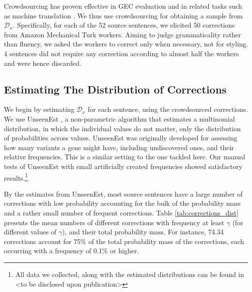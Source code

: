 \documentclass[letter,11pt]{article}
\begin{document}
Crowdsourcing has proven effective in GEC evaluation \cite{madnani2011they,napoles2015ground} and in
related tasks such as machine translation \cite{zaidan2011crowdsourcing,post2012constructing}. We thus
use crowdsourcing for obtaining a sample from $\mathcal{D}_x$. Specifically, for each of the 52 source
sentences, we elicited 50 corrections from Amazon Mechanical Turk workers.
Aiming to judge grammaticality rather than fluency, we asked the workers to
correct only when necessary, not for styling.
4 sentences did not require any correction according to almost half the workers and were hence discarded.
%
\subsection{Estimating The Distribution of Corrections}\label{subsec:corrections_distribution}
%
We begin by estimating $\mathcal{D}_x$ for each sentence, using the crowdsourced corrections.
We use {\sc UnseenEst} \cite{zou2015quantifying}, a non-parametric algorithm that
estimates a multinomial distribution,
in which the individual values do not matter, only the distribution of probabilities
across values.%
{\sc UnseenEst} was originally developed for assessing how many
variants a gene might have, including undiscovered ones,
and their relative frequencies.
This is a similar setting to the one tackled here.
Our manual tests of {\sc UnseenEst} with small artificially created frequencies
showed satisfactory results.\footnote{All data we collected, along with the estimated
  distributions can be found in <to be disclosed upon publication>}

By the estimates from {\sc UnseenEst}, most source sentences have a large number of
corrections with low probability accounting for the bulk of the probability mass
and a rather small number of frequent corrections.
Table \ref{tab:corrections_dist} presents the mean numbers of different corrections with frequency at least
$\gamma$ (for different values of $\gamma$), and their total probability mass.
For instance, 74.34 corrections account for 75\% of the total probability mass of the corrections, each
occurring with a frequency of 0.1\% or higher.
\end{document}
